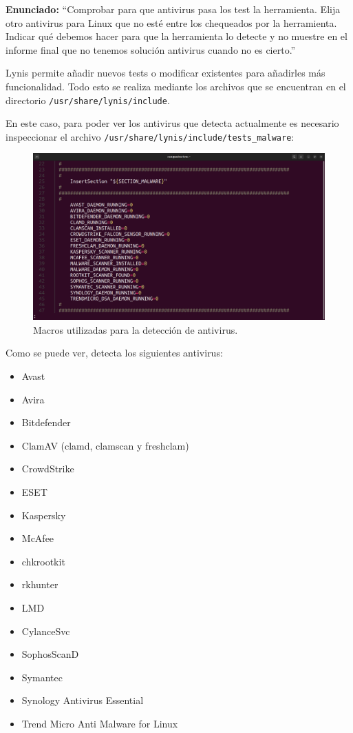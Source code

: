 \documentclass{article}
\begin{document}
\textbf{Enunciado: }``Comprobar para que antivirus pasa los test la herramienta. Elija otro antivirus para Linux que no esté entre los chequeados por la herramienta. Indicar qué debemos hacer para que la herramienta lo detecte y no muestre en el informe final que no tenemos solución antivirus cuando no es cierto.''

\bigskip

Lynis permite añadir nuevos tests o modificar existentes para añadirles más funcionalidad. Todo esto se realiza mediante los archivos que se encuentran en el directorio \verb|/usr/share/lynis/include|.

En este caso, para poder ver los antivirus que detecta actualmente es necesario inspeccionar el archivo \verb|/usr/share/lynis/include/tests_malware|:

\begin{figure}[H]
    \includegraphics[width=\textwidth]{imagenes/antivirus1.png}
    \caption{Macros utilizadas para la detección de antivirus.}
\end{figure}

\newpage

Como se puede ver, detecta los siguientes antivirus: 

\begin{itemize}
    \item Avast
    \item Avira
    \item Bitdefender
    \item ClamAV (clamd, clamscan y freshclam)
    \item CrowdStrike
    \item ESET
    \item Kaspersky
    \item McAfee
    \item chkrootkit
    \item rkhunter
    \item LMD
    \item CylanceSvc
    \item SophosScanD
    \item Symantec
    \item Synology Antivirus Essential
    \item Trend Micro Anti Malware for Linux
\end{itemize}
\end{document}
